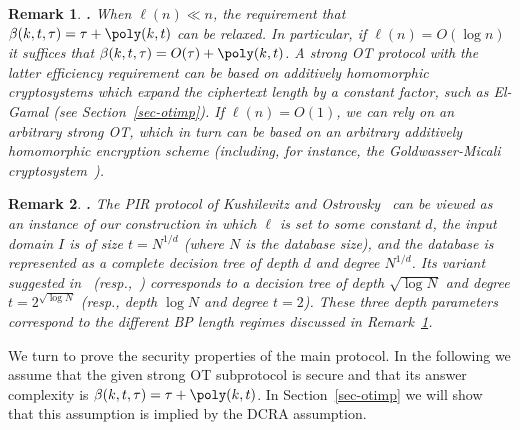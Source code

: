 \documentclass{article}
\newcommand{\otl}{{\tau}}
\newtheorem{REMARK}{Remark}[section]
\newenvironment{remark}{\begin{REMARK} \hspace{-.85em} {\bf .} \rm}%
	{\end{REMARK}}
\begin{document}
\begin{remark}
\label{rem-shallow}
When $\ell(n)\ll n$, the requirement that
$\beta(k,t,\otl)=\otl+\poly(k,t)$ can be relaxed. In particular, if
$\ell(n)=O(\log n)$ it suffices that
$\beta(k,t,\otl)=O(\otl)+\poly(k,t)$. A strong OT protocol with the
latter efficiency requirement can be based on additively homomorphic
cryptosystems which expand the ciphertext length by a constant
factor, such as El-Gamal (see Section~\ref{sec-otimp}). If
$\ell(n)=O(1)$, we can rely on an arbitrary strong OT, which in
turn can be based on an arbitrary additively homomorphic encryption scheme
(including, for instance, the Goldwasser-Micali
cryptosystem~\cite{GM}).
\end{remark}

\begin{remark}
The PIR protocol of Kushilevitz and Ostrovsky~\cite{KO97} can be
viewed as an instance of our construction in which $\ell$ is set to
some constant $d$, the input domain $I$ is of size $t=N^{1/d}$
(where $N$ is the database size), and the database is represented
as a complete decision tree of depth $d$ and degree $N^{1/d}$. Its
variant suggested in~\cite{Ste98} (resp.,~\cite{L04}) corresponds
to a decision tree of depth $\sqrt{\log N}$ and degree
$t=2^{\sqrt{\log N}}$ (resp., depth $\log N$ and degree $t=2$).
These three depth parameters correspond to the different BP length
regimes discussed in Remark~\ref{rem-shallow}.
\end{remark}

We turn to prove the security properties of the main protocol. In
the following we assume that the given strong OT subprotocol is
secure and that its answer complexity is
$\beta(k,t,\otl)=\otl+\poly(k,t)$. In Section~\ref{sec-otimp} we
will show that this assumption is implied by the DCRA assumption.
\end{document}
